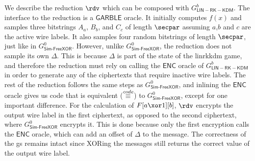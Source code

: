 We describe the reduction $\rdv$ which can be composed with $G^{b}_{\mathsf{LIN-RK-KDM}}$. The interface to the reduction is a $\mathsf{GARBLE}$ oracle. It initially computes $f(x)$ and samples three bitstrings $A_a$, $B_b$, and $C_c$ of length $\secpar$ assuming $a$,$b$ and $c$ are the active wire labels. It also samples four random bitstrings of length $\secpar$, just like in $G^0_\mathsf{Sim\text{-}FreeXOR}$. However, unlike $G^0_\mathsf{Sim\text{-}FreeXOR}$, the reduction does not sample its own $\Delta$. This is because $\Delta$ is part of the state of the \acrshort{linrkkdm} game, and therefore the reduction must rely on calling the $\mathsf{ENC}$ oracle of $G^{b}_{\mathsf{LIN-RK-KDM}}$ in order to generate any of the ciphertexts that require inactive wire labels. The rest of the reduction follows the same steps as $G^0_\mathsf{Sim\text{-}FreeXOR}$, and inlining the $\mathsf{ENC}$ oracle gives us code that is equivalent ($\overset{\textit{code}}{\equiv}$) to $G^0_\mathsf{Sim\text{-}FreeXOR}$, except for one important difference. For the calculation of $F[a\xor 1][b]$, $\rdv$ encrypts the output wire label in the first ciphertext, as opposed to the second ciphertext, where $G^0_\mathsf{Sim\text{-}FreeXOR}$ encrypts it. This is done because only the first encryption calls the $\mathsf{ENC}$ oracle, which can add an offset of $\Delta$ to the message. The correctness of the \acrlong{gs}  remains intact since XORing the messages still returns the correct value of the output wire label.



